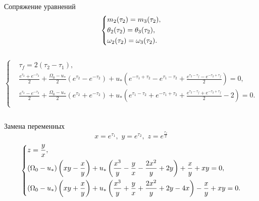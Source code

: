 \documentclass[10pt]{beamer}
\begin{document}
\begin{frame}{Сопряжение уравнений}
	\begin{equation}
		\left\{ {\begin{aligned}
					 & m_2(\tau_2) = m_3(\tau_2), \hfill            \\
					 & \theta_2(\tau_2) =  \theta_3(\tau_2), \hfill \\
					 & \omega_2(\tau_2) = \omega_3(\tau_2) . \hfill \\
				\end{aligned}} \right.
	\end{equation}
	\begin{columns}
		{\footnotesize
			\[
				\left\{ {\begin{aligned}
							 & \tau_f=2(\tau_2-\tau_1),                                                                                                                                                                 \\
							 & \frac{e^{\tau_2}+e^{-\tau_2}}{2}+\frac{\Omega_0-u_*}{2}(e^{\tau_2}-e^{-\tau_2})+u_*\left(e^{-\tau_1+\tau_2}-e^{\tau_1-\tau_2}+\frac{e^{\tau_2-\tau_f}-e^{-\tau_2+\tau_f}}{2}\right)=0,   \\
							 & \frac{e^{\tau_2}-e^{-\tau_2}}{2}+\frac{\Omega_0-u_*}{2}(e^{\tau_2}+e^{-\tau_2})+u_*\left(e^{\tau_1-\tau_2}+e^{-\tau_1+\tau_2}+\frac{e^{\tau_2-\tau_f}+e^{-\tau_2+\tau_f}}{2}-2\right)=0. \\
						\end{aligned}} \right.
			\]
		}
	\end{columns}
\end{frame}

\begin{frame}{Замена переменных}
	\[
		x=e^{\tau_1} ,\,\,y=e^{\tau_2} ,\,\,z=e^{\frac{\tau_f}{2}}
	\]
	\begin{equation}\label{fullchanged}
		\left\{ {\begin{aligned}
					 & z=\frac{y}{x}, \hfill                                                                                                              \\
					 & (\Omega_0-u_*)\left( xy-\frac{x}{y}\right)+u_*\left(\frac{x^3}{y}-\frac{y}{x}-\frac{2x^2}{y}+2y\right)+\frac{x}{y}+xy=0, \hfill    \\
					 & (\Omega_0-u_*)\left( xy+\frac{x}{y}\right)+u_*\left(\frac{x^3}{y}+\frac{y}{x}+\frac{2x^2}{y}+2y-4x\right)-\frac{x}{y}+xy=0. \hfill \\
				\end{aligned}} \right.
	\end{equation}
\end{frame}
\end{document}
